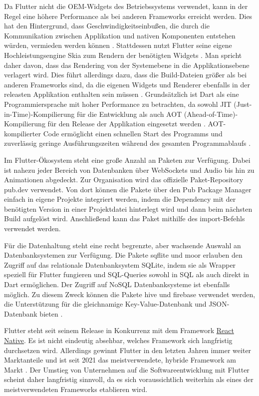 \documentclass[]{lni}
\begin{document}
Da Flutter nicht die OEM-Widgets des Betriebssystems verwendet, kann in der Regel eine höhere Performance als bei anderen Frameworks erreicht werden. Dies hat den Hintergrund, dass Geschwindigkeitseinbußen, die durch die Kommunikation zwischen Applikation und nativen Komponenten entstehen würden, vermieden werden können \cite{HeliosBlog.2020}. Stattdessen nutzt Flutter seine eigene Hochleistungsengine Skia zum Rendern der benötigten Widgets \cite{Wu.2018}. Man spricht daher davon, dass das Rendering von der Systemebene in die Applikationsebene verlagert wird. Dies führt allerdings dazu, dass die Build-Dateien größer als bei anderen Frameworks sind, da die eigenen Widgets und Renderer ebenfalls in der releasten Applikation enthalten sein müssen \cite{Wu.2018}. Grundsätzlich ist Dart als eine Programmiersprache mit hoher Performance zu betrachten, da sowohl JIT (Just-in-Time)-Kompilierung für die Entwicklung als auch AOT (Ahead-of-Time)-Kompilierung für den Release der Applikation eingesetzt werden \cite{DartDocumentation.02.11.2022}. AOT-kompilierter Code ermöglicht einen schnellen Start des Programms und zuverlässig geringe Ausführungszeiten während des gesamten Programmablaufs \cite{Obinna.07.04.2020}.

Im Flutter-Ökosystem steht eine große Anzahl an Paketen zur Verfügung. Dabei ist nahezu jeder Bereich von Datenbanken über WebSockets und Audio bis hin zu Animationen abgedeckt. Zur Organisation wird das offizielle Paket-Repository pub.dev verwendet. Von dort können die Pakete über den Pub Package Manager einfach in eigene Projekte integriert werden, indem die Dependency mit der benötigten Version in einer Projektdatei hinterlegt wird und dann beim nächsten Build aufgelöst wird. Anschließend kann das Paket mithilfe des import-Befehls verwendet werden.

Für die Datenhaltung steht eine recht begrenzte, aber wachsende Auswahl an Datenbanksystemen zur Verfügung. Die Pakete sqflite und moor erlauben den Zugriff auf das relationale Datenbanksystem SQLite, indem sie als Wrapper speziell für Flutter fungieren und SQL-Queries sowohl in SQL als auch direkt in Dart ermöglichen. Der Zugriff auf NoSQL Datenbanksysteme ist ebenfalls möglich. Zu diesem Zweck können die Pakete hive und firebase verwendet werden, die Unterstützung für die gleichnamige Key-Value-Datenbank und JSON-Datenbank bieten \cite{Greenrobot.2021}.

Flutter steht seit seinem Release in Konkurrenz mit dem Framework \hyperref[sec:ReactNative]{React Native}. Es ist nicht eindeutig absehbar, welches Framework sich langfristig durchsetzen wird. Allerdings gewinnt Flutter in den letzten Jahren immer weiter Marktanteile und ist seit 2021 das meistverwendete, hybride Framework am Markt \cite{Statista.21.10.2022}. Der Umstieg von Unternehmen auf die Softwareentwicklung mit Flutter scheint daher langfristig sinnvoll, da es sich voraussichtlich weiterhin als eines der meistverwendeten Frameworks etablieren wird.
\end{document}
